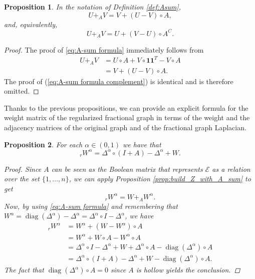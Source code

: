 \documentclass[a4paper,12pt]{article}
\newtheorem{proposition}{Proposition}
\DeclareMathOperator{\diag}{diag}
\newcommand{\cE}{\mathcal{E}}
\newcommand{\fL}{\Delta^\alpha}
\newcommand{\fW}{W^\alpha}
\newcommand{\rfW}{{}_r\fW}
\begin{document}
\begin{proposition}\label{prop:A-sum formula} In the notation of Definition \ref{def:Asum},
\begin{equation} \label{eq:A-sum formula}
    U +_A V = V + (U-V) \circ A,
\end{equation}
and, equivalently,
\begin{equation} \label{eq:A-sum formula complement}
    U +_A V = U + (V-U) \circ A^C.
\end{equation}
\end{proposition}
\begin{proof} The proof of \eqref{eq:A-sum formula} immediately follows from
    \begin{align*}
        U +_A V  &= U \circ A + V \circ \mathbf{1}\mathbf{1}^T -  V \circ A\\
        & = V + (U-V) \circ A.
    \end{align*}
The proof of (\ref{eq:A-sum formula complement}) is identical and is therefore omitted. 
\end{proof}



Thanks to the previous propositions, we can provide an
explicit formula for the weight matrix of the regularized fractional graph in terms of the weight and the adjacency matrices of the original graph and of the fractional graph Laplacian.

\begin{proposition}\label{prop:build_reg_adj_matrix}
For each $\alpha\in(0,1)$ we have that
    \begin{equation}\label{eq:reg_adj_matrix}
        \rfW = \fL \circ (I+A) - \fL +W.
    \end{equation}
    \begin{proof}
    Since $A$ can be seen as the Boolean matrix that represents $\cE$ as a relation over the set $\{1,\dots,n\}$, we can apply Proposition \ref{prop:build_Z_with_A_sum} to get 
    \begin{equation*}
    \rfW = W +_A \fW. 
    \end{equation*}
Now, by using \eqref{eq:A-sum formula} and remembering that $\fW = \diag(\fL) - \fL =  \fL \circ I - \fL $, 
we have 
        \begin{align*}
        \rfW &= \fW +(W - \fW) \circ A   \\
            &= \fW + W\circ A  - \fW \circ A   \\
            & = \fL \circ I - \fL  +W + \fL \circ A - \diag(\fL) \circ A \\
            & =  \fL \circ (I+A) - \fL +W  - \diag(\fL) \circ A .
        \end{align*}
The fact that $\diag(\fL) \circ A=0$ since $A$ is hollow yields the conclusion.
    \end{proof}
\end{proposition} 
\end{document}

